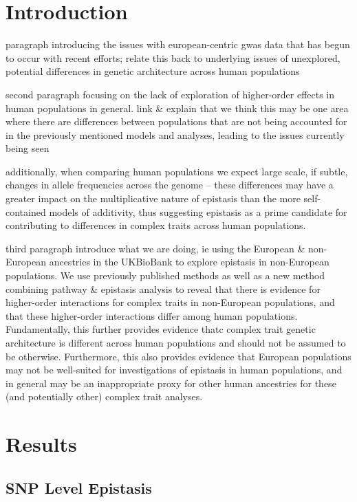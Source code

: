 \documentclass[12pt, a4paper]{article}
\begin{document}
\section{Introduction}\label{InterPath-Introduction}

paragraph introducing the issues with european-centric gwas data that has begun to occur with recent efforts; relate this back to underlying issues of unexplored, potential differences in genetic architecture across human populations

second paragraph focusing on the lack of exploration of higher-order effects in human populations in general. link \& explain that we think this may be one area where there are differences between populations that are not being accounted for in the previously mentioned models and analyses, leading to the issues currently being seen

additionally, when comparing human populations we expect large scale, if subtle, changes in allele frequencies across the genome -- these differences may have a greater impact on the multiplicative nature of epistasis than the more self-contained models of additivity, thus suggesting epistasis as a prime candidate for contributing to differences in complex traits across human populations. 

third paragraph introduce what we are doing, ie using the European \& non-European ancestries in the UKBioBank to explore epistasis in non-European populations. We use previously published methods as well as a new method combining pathway \& epistasis analysis to reveal that there is evidence for higher-order interactions for complex traits in non-European populations, and that these higher-order interactions differ among human populations. Fundamentally, this further provides evidence thatc complex trait genetic architecture is  different across human populations and should not be assumed to be otherwise. Furthermore, this also provides evidence that European populations may not be well-suited for investigations of epistasis in human populations, and in general may be an inappropriate proxy for other human ancestries for these (and potentially other) complex trait analyses. 




\section{Results}\label{InterPath-Results}


\subsection{SNP Level Epistasis}\label{InterPath-Results-SNPEpistasis}
\end{document}
